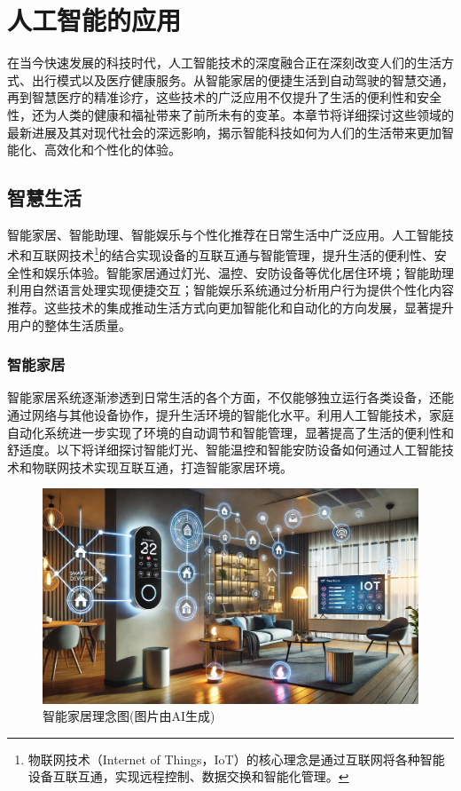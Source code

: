 \chapter{人工智能的应用}
在当今快速发展的科技时代，人工智能技术的深度融合正在深刻改变人们的生活方式、出行模式以及医疗健康服务。从智能家居的便捷生活到自动驾驶的智慧交通，再到智慧医疗的精准诊疗，这些技术的广泛应用不仅提升了生活的便利性和安全性，还为人类的健康和福祉带来了前所未有的变革。本章节将详细探讨这些领域的最新进展及其对现代社会的深远影响，揭示智能科技如何为人们的生活带来更加智能化、高效化和个性化的体验。

\section{智慧生活}

智能家居、智能助理、智能娱乐与个性化推荐在日常生活中广泛应用。人工智能技术和互联网技术\footnote{物联网技术（Internet of Things，IoT）的核心理念是通过互联网将各种智能设备互联互通，实现远程控制、数据交换和智能化管理。}的结合实现设备的互联互通与智能管理，提升生活的便利性、安全性和娱乐体验。智能家居通过灯光、温控、安防设备等优化居住环境；智能助理利用自然语言处理实现便捷交互；智能娱乐系统通过分析用户行为提供个性化内容推荐。这些技术的集成推动生活方式向更加智能化和自动化的方向发展，显著提升用户的整体生活质量。

\subsection{智能家居}

智能家居系统逐渐渗透到日常生活的各个方面，不仅能够独立运行各类设备，还能通过网络与其他设备协作，提升生活环境的智能化水平。利用人工智能技术，家庭自动化系统进一步实现了环境的自动调节和智能管理，显著提高了生活的便利性和舒适度。以下将详细探讨智能灯光、智能温控和智能安防设备如何通过人工智能技术和物联网技术实现互联互通，打造智能家居环境。

\begin{figure}[ht]
  \centering
  \includegraphics[width=\linewidth]{image/4/智能家居.png}
  \caption{智能家居理念图(图片由AI生成)}
  \label{fig:智能家居}
\end{figure}

